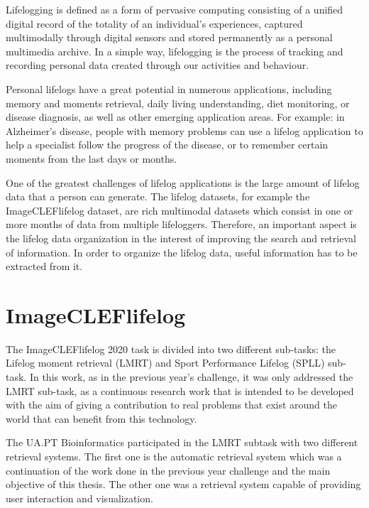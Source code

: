 Lifelogging is defined as a form of pervasive computing consisting of a unified digital record of the totality of an individual’s experiences, captured multimodally through digital sensors and stored permanently as a personal multimedia archive. In a simple way, lifelogging is the process of tracking and recording personal data created through our activities and behaviour.

Personal lifelogs have a great potential in numerous applications, including memory and moments retrieval, daily living understanding, diet monitoring, or disease diagnosis, as well as other emerging application areas. For example: in Alzheimer’s disease, people with memory problems can use a lifelog application to help a specialist follow the progress of the disease, or to remember certain moments from the last days or months.

One of the greatest challenges of lifelog applications is the large amount of lifelog data that a person can generate. The lifelog datasets, for example the ImageCLEFlifelog dataset, are rich multimodal datasets which consist in one or more months of data from multiple lifeloggers. Therefore, an important aspect is the lifelog data organization in the interest of improving the search and retrieval of information. In order to organize the lifelog data, useful information has to be extracted from it. 

\newpage
\section{ImageCLEFlifelog}

\label{sec:imagecleflifelog}


The ImageCLEFlifelog 2020 task is divided into two different sub-tasks: the Lifelog moment retrieval (LMRT) and Sport Performance Lifelog (SPLL) sub-task. In this work, as in the previous year’s challenge, it was only addressed the LMRT sub-task, as a continuous research work that is intended to be developed with the aim of giving a contribution to real problems that exist around the world that can benefit from this technology.
    
The UA.PT Bioinformatics participated in the LMRT subtask with two different retrieval systems. The first one is the automatic retrieval system which was a continuation of the work done in the previous year challenge \cite{Ribeiro2019} and the main objective of this thesis. The other one was a retrieval system capable of providing user interaction and visualization. 

